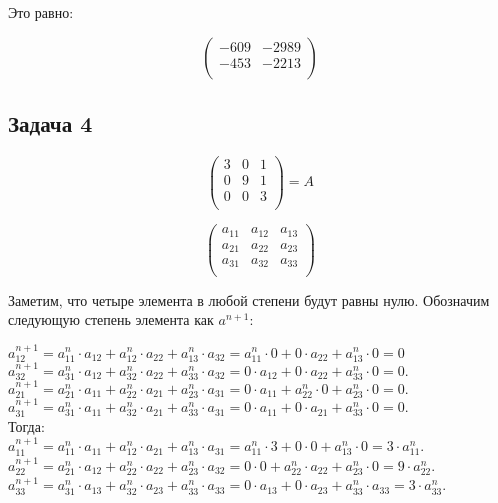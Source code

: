 	Это равно:
	
	\[
	\begin{pmatrix}
	-609 & -2989 \\
	-453 & -2213 \\
	\end{pmatrix}
	\]
	
	\subsection{Задача 4} 
	
	\[
	\begin{pmatrix}
	3 & 0 & 1 \\
	0 & 9 & 1 \\
	0 & 0 & 3 \\ 
	\end{pmatrix} = A
	\]
	
	\[
	\begin{pmatrix}
	a_{11} & a_{12}  & a_{13}  \\
	a_{21}  & a_{22}  & a_{23}  \\
	a_{31}  & a_{32}  & a_{33}  \\
	\end{pmatrix}
	\]			
	
	Заметим, что четыре элемента в любой степени будут равны нулю. Обозначим следующую степень элемента как $a^{n+1}$: 
	
	$a_{12}^{n+1} = a_{11}^{n} \cdot a_{12} + a_{12}^{n} \cdot a_{22} + a_{13}^{n} \cdot a_{32} = a_{11}^{n} \cdot 0 + 0 \cdot a_{22} + a_{13}^{n} \cdot 0 = 0$ \\ 
	$a_{32}^{n+1} = a_{31}^{n} \cdot a_{12} + a_{32}^{n} \cdot a_{22} + a_{33}^{n} \cdot a_{32} = 0 \cdot a_{12} + 0 \cdot a_{22} + a_{33}^{n} \cdot 0 = 0.$\\
	$a_{21}^{n+1} = a_{21}^{n} \cdot a_{11} + a_{22}^{n} \cdot a_{21} + a_{23}^{n} \cdot a_{31} = 0 \cdot a_{11} + a_{22}^{n} \cdot 0 + a_{23}^{n} \cdot 0 = 0.$ \\
	$a_{31}^{n+1} = a_{31}^{n} \cdot a_{11} + a_{32}^{n} \cdot a_{21} + a_{33}^{n} \cdot a_{31} = 0 \cdot a_{11} + 0 \cdot a_{21} + a_{33}^{n} \cdot 0 = 0.$ \\
	
	Тогда: \\
	$a_{11}^{n+1} = a_{11}^{n} \cdot a_{11} + a_{12}^{n} \cdot a_{21} + a_{13}^{n} \cdot a_{31} = a_{11}^{n} \cdot 3 + 0 \cdot 0 + a_{13}^{n} \cdot 0 =  3 \cdot a_{11}^{n}$.
	$a_{22}^{n+1} = a_{21}^{n} \cdot a_{12} + a_{22}^{n} \cdot a_{22} + a_{23}^{n} \cdot a_{32} = 0 \cdot 0 + a_{22}^{n} \cdot a_{22} + a_{23}^{n} \cdot 0 =  9 \cdot a_{22}^{n}$.
	$a_{33}^{n+1} = a_{31}^{n} \cdot a_{13} + a_{32}^{n} \cdot a_{23} + a_{33}^{n} \cdot a_{33} = 0 \cdot a_{13} + 0 \cdot a_{23} + a_{33}^{n} \cdot a_{33} = 3 \cdot a_{33}^{n}$.
	
